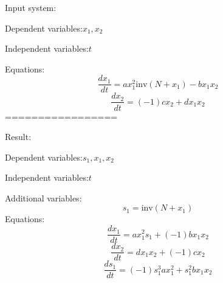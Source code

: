 \documentclass[10pt,a4paper]{article}
\begin{document}
Input system:

Dependent variables:$x_{1}, x_{2}$

Independent variables:$t$

Equations:
\begin{dmath*}\frac{dx_{1}}{dt} = a  x_{1} ^ {2}  \text{inv}\left(N + x_{1}\right) - b  x_{1}  x_{2}\end{dmath*}
\begin{dmath*}\frac{dx_{2}}{dt} = \left(-1\right)  c  x_{2} + d  x_{1}  x_{2}\end{dmath*}
=================

Result:

Dependent variables:$s_{1}, x_{1}, x_{2}$

Independent variables:$t$

Additional variables:
\begin{dmath*}s_{1} = \text{inv}\left(N + x_{1}\right)\end{dmath*}
Equations:
\begin{dmath*}\frac{dx_{1}}{dt} = a  x_{1} ^ {2}  s_{1} + \left(-1\right)  b  x_{1}  x_{2}\end{dmath*}
\begin{dmath*}\frac{dx_{2}}{dt} = d  x_{1}  x_{2} + \left(-1\right)  c  x_{2}\end{dmath*}
\begin{dmath*}\frac{ds_{1}}{dt} = \left(-1\right)  s_{1} ^ {3}  a  x_{1} ^ {2} + s_{1} ^ {2}  b  x_{1}  x_{2}\end{dmath*}
\end{document}
